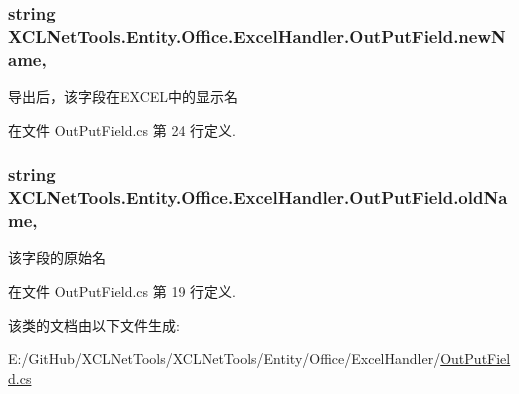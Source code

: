 \subsubsection[{\texorpdfstring{new\+Name}{newName}}]{\setlength{\rightskip}{0pt plus 5cm}string X\+C\+L\+Net\+Tools.\+Entity.\+Office.\+Excel\+Handler.\+Out\+Put\+Field.\+new\+Name\hspace{0.3cm}{\ttfamily [get]}, {\ttfamily [set]}}\hypertarget{class_x_c_l_net_tools_1_1_entity_1_1_office_1_1_excel_handler_1_1_out_put_field_a5889d2738a4a65d809b67457e37429fd}{}\label{class_x_c_l_net_tools_1_1_entity_1_1_office_1_1_excel_handler_1_1_out_put_field_a5889d2738a4a65d809b67457e37429fd}


导出后，该字段在\+E\+X\+C\+E\+L中的显示名 



在文件 Out\+Put\+Field.\+cs 第 24 行定义.

\subsubsection[{\texorpdfstring{old\+Name}{oldName}}]{\setlength{\rightskip}{0pt plus 5cm}string X\+C\+L\+Net\+Tools.\+Entity.\+Office.\+Excel\+Handler.\+Out\+Put\+Field.\+old\+Name\hspace{0.3cm}{\ttfamily [get]}, {\ttfamily [set]}}\hypertarget{class_x_c_l_net_tools_1_1_entity_1_1_office_1_1_excel_handler_1_1_out_put_field_a6f62cc17246410ac6f6a352cd04bc1a2}{}\label{class_x_c_l_net_tools_1_1_entity_1_1_office_1_1_excel_handler_1_1_out_put_field_a6f62cc17246410ac6f6a352cd04bc1a2}


该字段的原始名 



在文件 Out\+Put\+Field.\+cs 第 19 行定义.



该类的文档由以下文件生成\+:\begin{DoxyCompactItemize}
\item 
E\+:/\+Git\+Hub/\+X\+C\+L\+Net\+Tools/\+X\+C\+L\+Net\+Tools/\+Entity/\+Office/\+Excel\+Handler/\hyperlink{_out_put_field_8cs}{Out\+Put\+Field.\+cs}\end{DoxyCompactItemize}

